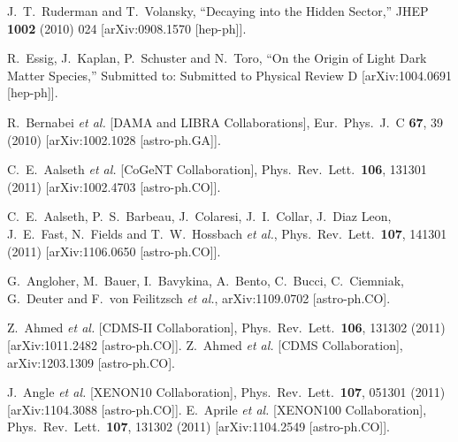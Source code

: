 J.~T.~Ruderman and T.~Volansky,
``Decaying into the Hidden Sector,''
JHEP {\bf 1002} (2010) 024
[arXiv:0908.1570 [hep-ph]].

R.~Essig, J.~Kaplan, P.~Schuster and N.~Toro,
``On the Origin of Light Dark Matter Species,''
Submitted to: Submitted to Physical Review D
[arXiv:1004.0691 [hep-ph]].

  R.~Bernabei {\it et al.}  [DAMA and LIBRA Collaborations],
  Eur.\ Phys.\ J.\ C {\bf 67}, 39 (2010)
  [arXiv:1002.1028 [astro-ph.GA]].

  C.~E.~Aalseth {\it et al.}  [CoGeNT Collaboration],
  Phys.\ Rev.\ Lett.\  {\bf 106}, 131301 (2011)
  [arXiv:1002.4703 [astro-ph.CO]].

  C.~E.~Aalseth, P.~S.~Barbeau, J.~Colaresi, J.~I.~Collar, J.~Diaz Leon, J.~E.~Fast, N.~Fields and T.~W.~Hossbach {\it et al.},
  Phys.\ Rev.\ Lett.\  {\bf 107}, 141301 (2011)
  [arXiv:1106.0650 [astro-ph.CO]].

  G.~Angloher, M.~Bauer, I.~Bavykina, A.~Bento, C.~Bucci, C.~Ciemniak, G.~Deuter and F.~von Feilitzsch {\it et al.},
  arXiv:1109.0702 [astro-ph.CO].

  Z.~Ahmed {\it et al.}  [CDMS-II Collaboration],
  Phys.\ Rev.\ Lett.\  {\bf 106}, 131302 (2011)
  [arXiv:1011.2482 [astro-ph.CO]].
  Z.~Ahmed {\it et al.}  [CDMS Collaboration],
  arXiv:1203.1309 [astro-ph.CO].

  J.~Angle {\it et al.}  [XENON10 Collaboration],
  Phys.\ Rev.\ Lett.\  {\bf 107}, 051301 (2011)
  [arXiv:1104.3088 [astro-ph.CO]].
  E.~Aprile {\it et al.}  [XENON100 Collaboration],
  Phys.\ Rev.\ Lett.\  {\bf 107}, 131302 (2011)
  [arXiv:1104.2549 [astro-ph.CO]].

